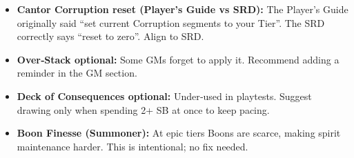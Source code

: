 \documentclass[11pt]{article}
\begin{document}
\begin{itemize}
    \item \textbf{Cantor Corruption reset (Player’s Guide vs SRD):} The Player’s Guide originally said “set current Corruption segments to your Tier”. The SRD correctly says “reset to zero”. Align to SRD.
    \item \textbf{Over‑Stack optional:} Some GMs forget to apply it. Recommend adding a reminder in the GM section.
    \item \textbf{Deck of Consequences optional:} Under‑used in playtests. Suggest drawing only when spending 2+ SB at once to keep pacing.
    \item \textbf{Boon Finesse (Summoner):} At epic tiers Boons are scarce, making spirit maintenance harder. This is intentional; no fix needed.
\end{itemize}
\end{document}
